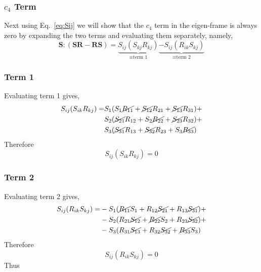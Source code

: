 \subsubsection{$c_{4}$ Term}
Next using Eq.~\ref{eq:Sij} we will show that the $c_{4}$ term in the eigen-frame is always zero
by expanding the two terms and evaluating them separately, namely,
\begin{equation}
    \mathbf{S}:( \mathbf{SR} - \mathbf{RS}) = 
        \underbrace{S_{ij}(S_{kj}R_{kj})}_{\equiv \text{term 1}} 
        \underbrace{ - S_{ij}(R_{ik}S_{kj})}_{\equiv \text{term 2}}
\end{equation}
\subsubsection{Term 1}
Evaluating term 1 gives,
\begin{equation}
    \begin{split}
        S_{ij}(S_{ik}R_{kj}) = &
                S_{1}(S_{1} \cancel{R_{11}} + \cancel{S_{12}} R_{21} + \cancel{S_{13}} R_{31}) + \\
            &   S_{2}(\cancel{S_{21}} R_{12} + S_{2} \cancel{R_{22}} + \cancel{S_{23}} R_{32}) + \\
            &   S_{3}(\cancel{S_{31}} R_{13} + \cancel{S_{32}} R_{23} + S_{3} \cancel{R_{33}})
    \end{split}
\end{equation}
Therefore
\begin{equation}
    S_{ij}(S_{ik}R_{kj}) = 0 
\end{equation}
\subsubsection{Term 2}
Evaluating term 2 gives,
\begin{equation}
    \begin{split}
        S_{ij}(R_{ik}S_{kj}) = &
               -S_{1}(\cancel{R_{11}} S_{1} + R_{12} \cancel{S_{21}} + R_{13} \cancel{S_{31}})+   \\
            &  -S_{2}(R_{21} \cancel{S_{12}} + \cancel{R_{22}} S_{2} + R_{23} \cancel{S_{32}})+   \\
            &  -S_{3}(R_{31} \cancel{S_{13}} + R_{32} \cancel{S_{32}} + \cancel{R_{33}} S_{3})
    \end{split}
\end{equation}
Therefore
\begin{equation}
    S_{ij}(R_{ik}S_{kj}) = 0
\end{equation}
Thus
